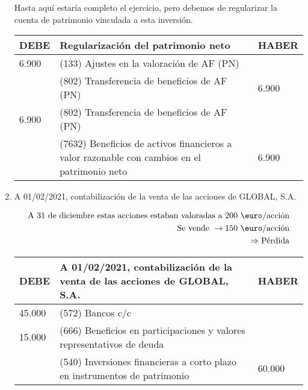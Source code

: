 \begin{enumerate}[label=\alph*)]
    Hasta aquí estaría completo el ejercicio, pero debemos de regularizar la cuenta de patrimonio vinculada a esta inversión.

    \begin{table}[H]
        \centering
        \begin{tabular}{|p{3cm}|p{6cm}|p{3cm}|}
        \hline
        \rowcolor{blue!30}
        \textbf{DEBE} & \textbf{Regularización del patrimonio neto} & \textbf{HABER} \\
        \hline
        6.900 & (133) Ajustes en la valoración de AF (PN) & \\
        \hline
        & (802) Transferencia de beneficios de AF (PN) & 6.900 \\
        \hline
        6.900 & (802) Transferencia de beneficios de AF (PN) & \\
        \hline
        & (7632) Beneficios de activos financieros a valor razonable con cambios en el patrimonio neto & 6.900 \\
        \hline
        \end{tabular}
    \end{table}

    \item A 01/02/2021, contabilización de la venta de las acciones de GLOBAL, S.A.
    
    \begin{align*}
        \text{A 31 de diciembre estas acciones estaban valoradas a 200 \euro/acción} \\
        \text{Se vende } \rightarrow 150 \text{ \euro/acción} \\
        \Rightarrow \text{Pérdida}
    \end{align*}

    \begin{table}[H]
        \centering
        \begin{tabular}{|p{3cm}|p{6cm}|p{3cm}|}
        \hline
        \rowcolor{blue!30}
        \textbf{DEBE} & \textbf{A 01/02/2021, contabilización de la venta de las acciones de GLOBAL, S.A.} & \textbf{HABER} \\
        \hline
        45.000 & (572) Bancos c/c & \\
        \hline
        15.000 & (666) Beneficios en participaciones y valores representativos de deuda & \\
        \hline
        & (540) Inversiones financieras a corto plazo en instrumentos de patrimonio & 60.000 \\
        \hline
        \end{tabular}
    \end{table}




\end{enumerate}
